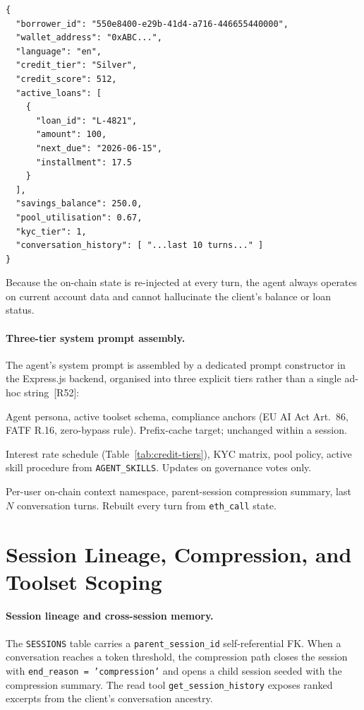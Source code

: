 \documentclass[12pt,a4paper]{report}
\begin{document}
\begin{verbatim}
{
  "borrower_id": "550e8400-e29b-41d4-a716-446655440000",
  "wallet_address": "0xABC...",
  "language": "en",
  "credit_tier": "Silver",
  "credit_score": 512,
  "active_loans": [
    {
      "loan_id": "L-4821",
      "amount": 100,
      "next_due": "2026-06-15",
      "installment": 17.5
    }
  ],
  "savings_balance": 250.0,
  "pool_utilisation": 0.67,
  "kyc_tier": 1,
  "conversation_history": [ "...last 10 turns..." ]
}
\end{verbatim}

\noindent Because the on-chain state is re-injected at every turn, the agent always operates on current account data and cannot hallucinate the client's balance or loan status.

\paragraph{Three-tier system prompt assembly.}
The agent's system prompt is assembled by a dedicated prompt constructor in the Express.js backend, organised into three explicit tiers rather than a single ad-hoc string~[R52]:

\begin{description}[noitemsep,leftmargin=0pt]
\item[\textbf{Stable tier.}] Agent persona, active toolset schema, compliance anchors (EU AI Act Art.~86, FATF R.16, zero-bypass rule). Prefix-cache target; unchanged within a session.
\item[\textbf{Context tier.}] Interest rate schedule (Table~\ref{tab:credit-tiers}), KYC matrix, pool policy, active skill procedure from \texttt{AGENT\_SKILLS}. Updates on governance votes only.
\item[\textbf{Volatile tier.}] Per-user on-chain context namespace, parent-session compression summary, last $N$ conversation turns. Rebuilt every turn from \texttt{eth\_call} state.
\end{description}

\section{Session Lineage, Compression, and Toolset Scoping}

\paragraph{Session lineage and cross-session memory.}
The \texttt{SESSIONS} table carries a \texttt{parent\_session\_id} self-referential FK. When a conversation reaches a token threshold, the compression path closes the session with \texttt{end\_reason = 'compression'} and opens a child session seeded with the compression summary. The read tool \texttt{get\_session\_history} exposes ranked excerpts from the client's conversation ancestry.
\end{document}
